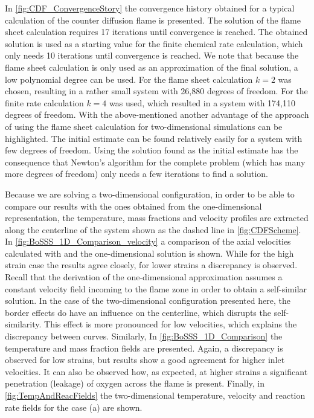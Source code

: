 In \cref{fig:CDF_ConvergenceStory} the convergence history obtained for a typical calculation of the counter diffusion flame is presented. The solution of the flame sheet calculation requires 17 iterations until convergence is reached. The obtained solution is used as a starting value for the finite chemical rate calculation, which only needs 10 iterations until convergence is reached. We note that because the flame sheet calculation is only used as an approximation of the final solution, a low polynomial degree can be used. For the flame sheet calculation $k = 2$ was chosen, resulting in a rather small system with 26,880 degrees of freedom. For the finite rate calculation $k = 4$ was used, which resulted in a system with 174,110 degrees of freedom.  With the above-mentioned another advantage of the approach of using the flame sheet calculation for two-dimensional simulations can be highlighted. The initial estimate can be found relatively easily for a system with few degrees of freedom. Using the solution found as the initial estimate has the consequence that Newton's algorithm for the complete problem (which has many more degrees of freedom) only needs a few iterations to find a solution. 

Because we are solving a two-dimensional configuration, in order to be able to compare our results with the ones obtained from the one-dimensional representation, the temperature, mass fractions and velocity profiles are extracted along the centerline of the system shown as the dashed line in \cref{fig:CDFScheme}. In \cref{fig:BoSSS_1D_Comparison_velocity} a comparison of the axial velocities calculated with \BoSSS and the one-dimensional solution is shown. While for the high strain case the results agree closely, for lower strains a discrepancy is observed. Recall that the derivation of the one-dimensional approximation assumes a constant velocity field incoming to the flame zone in order to obtain a self-similar solution. In the case of the two-dimensional configuration presented here, the border effects do have an influence on the centerline, which disrupts the self-similarity. This effect is more pronounced for low velocities, which explains the discrepancy between curves. Similarly, In \cref{fig:BoSSS_1D_Comparison} the temperature and mass fraction fields are presented. Again, a discrepancy is observed for low strains, but results show a good agreement for higher inlet velocities. It can also be observed how, as expected, \cite{fernandez-tarrazoSimpleOnestepChemistry2006} at higher strains a significant penetration (leakage) of oxygen across the flame is present. Finally, in \cref{fig:TempAndReacFields} the two-dimensional temperature, velocity and reaction rate fields for the case (a) are shown. 

